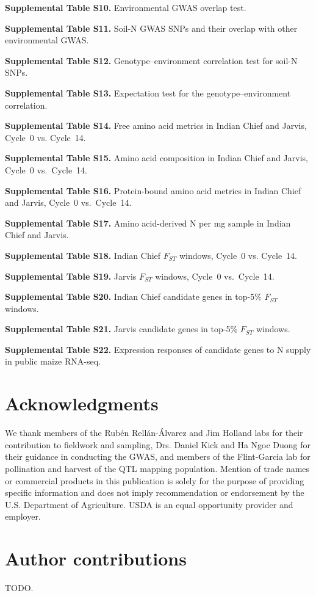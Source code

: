 \documentclass[namedate,unnumsec,webpdf,contemporary,large]{oup-authoring-template}
\begin{document}
\textbf{Supplemental Table S10.} Environmental GWAS overlap test.

\textbf{Supplemental Table S11.} Soil-N GWAS SNPs and their overlap with other environmental GWAS.

\textbf{Supplemental Table S12.} Genotype--environment correlation test for soil-N SNPs.

\textbf{Supplemental Table S13.} Expectation test for the genotype–environment correlation.

\textbf{Supplemental Table S14.} Free amino acid metrics in Indian Chief and Jarvis, Cycle~0 vs. Cycle~14.

\textbf{Supplemental Table S15.} Amino acid composition in Indian Chief and Jarvis, Cycle~0 vs.\ Cycle~14.

\textbf{Supplemental Table S16.} Protein-bound amino acid metrics in Indian Chief and Jarvis, Cycle~0 vs.\ Cycle~14.

\textbf{Supplemental Table S17.} Amino acid-derived N per mg sample in Indian Chief and Jarvis.

\textbf{Supplemental Table S18.} Indian Chief $F_{ST}$ windows, Cycle~0 vs. Cycle~14.

\textbf{Supplemental Table S19.} Jarvis $F_{ST}$ windows, Cycle~0 vs.\ Cycle~14.

\textbf{Supplemental Table S20.} Indian Chief candidate genes in top-5\% $F_{ST}$ windows.

\textbf{Supplemental Table S21.} Jarvis candidate genes in top-5\% $F_{ST}$ windows.

\textbf{Supplemental Table S22.} Expression responses of candidate genes to N supply in public maize RNA-seq.

\section{Acknowledgments}
We thank members of the Rub\'en Rell\'an-\'Alvarez and Jim Holland labs for their contribution to fieldwork and sampling, Drs. Daniel Kick and Ha Ngoc Duong for their guidance in conducting the GWAS, and members of the Flint-Garcia lab for pollination and harvest of the QTL mapping population. Mention of trade names or commercial products in this publication is solely for the purpose of providing specific information and does not imply recommendation or endorsement by the U.S. Department of Agriculture. USDA is an equal opportunity provider and employer.

\section{Author contributions}
TODO.
\end{document}
